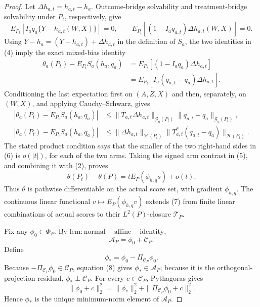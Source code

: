 \documentclass{article}
\begin{document}
\begin{proof}
Let \(\Delta h_{a,t}=h_{a,t}-h_a\).  Outcome-bridge solvability and treatment-bridge solvability under \(P_t\), respectively, give
\[
 E_{P_t}[I_aq_a\{Y-h_{a,t}(W,X)\}]=0,
 \qquad
 E_{P_t}[(1-I_aq_{a,t})\Delta h_{a,t}(W,X)]=0.                       \tag{4}
\]
Using \(Y-h_a=(Y-h_{a,t})+\Delta h_{a,t}\) in the definition of \(S_a\), the two identities in (4) imply the exact mixed-bias identity
\[
 \begin{aligned}
 \theta_a(P_t)-E_{P_t}S_a(h_a,q_a)
 &=E_{P_t}[(1-I_aq_a)\Delta h_{a,t}]\\
 &=E_{P_t}[I_a(q_{a,t}-q_a)\Delta h_{a,t}].                         \tag{5}
 \end{aligned}
\]
Conditioning the last expectation first on \((A,Z,X)\) and then, separately, on \((W,X)\), and applying Cauchy--Schwarz, gives
\[
 \begin{aligned}
 |\theta_a(P_t)-E_{P_t}S_a(h_a,q_a)|
 &\le
 \|T_{a,t}\Delta h_{a,t}\|_{\mathcal G_a(P_t)}
 \|q_{a,t}-q_a\|_{\mathcal G_a(P_t)},\\
 |\theta_a(P_t)-E_{P_t}S_a(h_a,q_a)|
 &\le
 \|\Delta h_{a,t}\|_{\mathcal H(P_t)}
 \|T_{a,t}^*(q_{a,t}-q_a)\|_{\mathcal H(P_t)}.                    \tag{6}
 \end{aligned}
\]
The stated product condition says that the smaller of the two right-hand sides in (6) is \(o(|t|)\), for each of the two arms.  Taking the signed arm contrast in (5), and combining it with (2), proves
\[
 \theta(P_t)-\theta(P)=tE_P(\phi_{h,q}s)+o(t).                      \tag{7}
\]
Thus \(\theta\) is pathwise differentiable on the actual score set, with gradient \(\phi_{h,q}\).  The continuous linear functional \(v\mapsto E_P(\phi_{h,q}v)\) extends (7) from finite linear combinations of actual scores to their \(L^2(P)\)-closure \(\mathcal T_P\).

Fix any \(\phi_0\in\Phi_P\).  By \(\mathrm{lem:normal-affine-identity}\),
\[
 \mathcal A_P=\phi_0+\mathcal C_P.                                 \tag{8}
\]
Define
\[
 \phi_* =\phi_0-\Pi_{\mathcal C_P}\phi_0.
\]
Because \(-\Pi_{\mathcal C_P}\phi_0\in\mathcal C_P\), equation (8) gives \(\phi_*\in\mathcal A_P\); because it is the orthogonal-projection residual, \(\phi_*\perp\mathcal C_P\).  For every \(c\in\mathcal C_P\), Pythagoras gives
\[
 \|\phi_0+c\|_2^2
 =\|\phi_*\|_2^2+\|\Pi_{\mathcal C_P}\phi_0+c\|_2^2.           \tag{9}
\]
Hence \(\phi_*\) is the unique minimum-norm element of \(\mathcal A_P\).


\end{proof}
\end{document}
